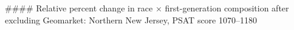#### Relative percent change in race × first-generation composition after excluding Geomarket: Northern New Jersey, PSAT score 1070–1180
